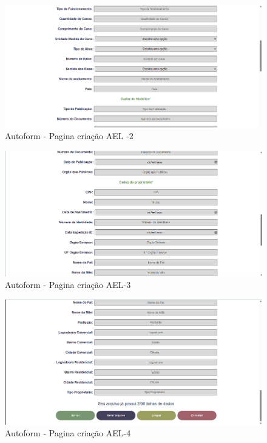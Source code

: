 \begin{figure}[htb]
    \caption{\label{fig:tela-ael2}Autoform - Pagina criação AEL -2}
    \begin{center}
        \includegraphics[scale=0.5]{imagens/autoform-ael-gerar2.png}
    \end{center}
\end{figure}
\begin{figure}[htb]
    \caption{\label{fig:tela-ael3}Autoform - Pagina criação AEL-3}
    \begin{center}
        \includegraphics[scale=0.5]{imagens/autoform-ael-gerar3.png}
    \end{center}
\end{figure}
\begin{figure}[htb]
    \caption{\label{fig:tela-ael4}Autoform - Pagina criação AEL-4}
    \begin{center}
        \includegraphics[scale=0.5]{imagens/autoform-ael-gerar4.png}
    \end{center}
\end{figure}
